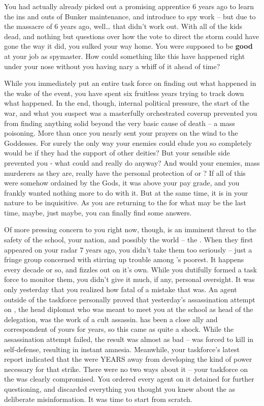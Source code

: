 \documentclass[char]{GL2020}
\begin{document}
You had actually already picked out a promising apprentice 6 years ago to learn the ins and outs of Bunker maintenance, and introduce to spy work -- but due to the massacre of 6 years ago, well\ldots{} that didn't work out. With all of the kids dead, and nothing but questions over how the vote to direct the storm could have gone the way it did, you sulked your way home. You were supposed to be \textbf{good} at your job as spymaster. How could something like this have happened right under your nose without you having nary a whiff of it ahead of time? 

While you immediately put an entire task force on finding out what happened in the wake of the event, you have spent six fruitless years trying to track down what happened. In the end, though, internal political pressure, the start of the war, and what you suspect was a masterfully orchestrated coverup prevented you from finding anything solid beyond the very basic cause of death -- a mass poisoning. More than once you nearly sent your prayers on the wind to the Goddesses. For surely the only way your enemies could elude you so completely would be if they had the support of other deities? But your sensible side prevented you - what could \cEbb{} and \cFlow{} really do anyway? And would your enemies, mass murderers as they are, really have the personal protection of \cTechGod{} or \cFarmGod{}? If all of this were somehow ordained by the Gods, it was above your pay grade, and you frankly wanted nothing more to do with it. But at the same time, it is in your nature to be inquisitive. As you are returning to the \pSchool{} for what may be the last time, maybe, just maybe, you can finally find some answers.

Of more pressing concern to you right now, though, is an imminent threat to the safety of the school, your nation, and possibly the world -- the \pGoaties{}. When they first appeared on your radar 7 years ago, you didn't take them too seriously – just a fringe group concerned with stirring up trouble among \pEarth{}'s poorest. It happens every decade or so, and fizzles out on it's own. While you dutifully formed a task force to monitor them, you didn't give it much, if any, personal oversight. It was only yesterday that you realized how fatal of a mistake that was. An agent outside of the taskforce personally proved that yesterday's assassination attempt on \cHeadDiplomat{\full}, the head diplomat who was meant to meet you at the school as head of the \pShip{} delegation, was the work of a cult assassin.  \cHeadDiplomat{} has been a close ally and correspondent of yours for years, so this came as quite a shock. While the assassination attempt failed, the result was almost as bad -- \cHeadDiplomat{} was forced to kill in self-defense, resulting in instant amnesia. Meanwhile, your taskforce's latest report indicated that the \pGoaties{} were YEARS away from developing the kind of power necessary for that strike. There were no two ways about it -- your taskforce on the \pGoaties{} was clearly compromised. You ordered every agent on it detained for further questioning, and discarded everything you thought you knew about the \pGoaties{} as deliberate misinformation. It was time to start from scratch.
\end{document}
